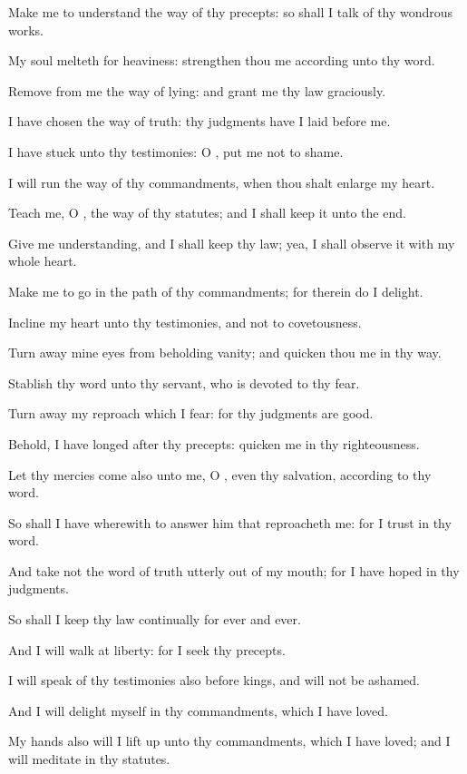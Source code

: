 \Verse Make me to understand the way of thy precepts: so shall I talk of thy wondrous works.

\Verse My soul melteth for heaviness: strengthen thou me according unto thy word.

\Verse Remove from me the way of lying: and grant me thy law graciously.

\Verse I have chosen the way of truth: thy judgments have I laid before me.

\Verse I have stuck unto thy testimonies: O \LORD, put me not to shame.

\Verse I will run the way of thy commandments, when thou shalt enlarge my heart.

\Verse Teach me, O \LORD, the way of thy statutes; and I shall keep it unto the end.

\Verse Give me understanding, and I shall keep thy law; yea, I shall observe it with my whole heart.

\Verse Make me to go in the path of thy commandments; for therein do I delight.

\Verse Incline my heart unto thy testimonies, and not to covetousness.

\Verse Turn away mine eyes from beholding vanity; and quicken thou me in thy way.

\Verse Stablish thy word unto thy servant, who is devoted to thy fear.

\Verse Turn away my reproach which I fear: for thy judgments are good.

\Verse Behold, I have longed after thy precepts: quicken me in thy righteousness.

\Verse Let thy mercies come also unto me, O \LORD, even thy salvation, according to thy word.

\Verse So shall I have wherewith to answer him that reproacheth me: for I trust in thy word.

\Verse And take not the word of truth utterly out of my mouth; for I have hoped in thy judgments.

\Verse So shall I keep thy law continually for ever and ever.

\Verse And I will walk at liberty: for I seek thy precepts.

\Verse I will speak of thy testimonies also before kings, and will not be ashamed.

\Verse And I will delight myself in thy commandments, which I have loved.

\Verse My hands also will I lift up unto thy commandments, which I have loved; and I will meditate in thy statutes.

